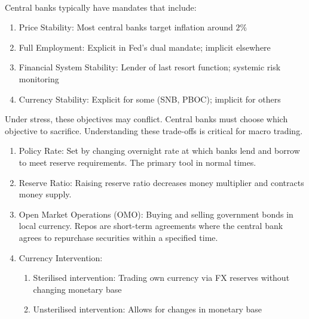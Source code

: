 \begin{remark} \\
Central banks typically have mandates that include:
\begin{enumerate}[label=\roman*.]
\setlength{\itemsep}{0pt}
\item Price Stability: Most central banks target inflation around $2\%$
\item Full Employment: Explicit in Fed's dual mandate; implicit elsewhere
\item Financial System Stability: Lender of last resort function; systemic risk monitoring
\item Currency Stability: Explicit for some (SNB, PBOC); implicit for others
\end{enumerate}
Under stress, these objectives may conflict. Central banks must choose which objective to sacrifice. Understanding these trade-offs is critical for macro trading.
\end{remark}

\begin{remark} 
\begin{enumerate}[label=\roman*.]
\setlength{\itemsep}{0pt}
\item Policy Rate: Set by changing overnight rate at which banks lend and borrow to meet reserve requirements. The primary tool in normal times.
\item Reserve Ratio: Raising reserve ratio decreases money multiplier and contracts money supply.
\item Open Market Operations (OMO): Buying and selling government bonds in local currency. Repos are short-term agreements where the central bank agrees to repurchase securities within a specified time.
\item Currency Intervention:
\begin{enumerate}[label=\arabic*.]
\setlength{\itemsep}{0pt}
\item Sterilised intervention: Trading own currency via FX reserves without changing monetary base
\item Unsterilised intervention: Allows for changes in monetary base
\end{enumerate}
\end{enumerate}
\end{remark}


